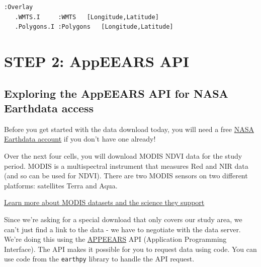 \documentclass[
  letterpaper,
  DIV=11,
  numbers=noendperiod,
  oneside]{scrreprt}
\begin{document}
\begin{verbatim}
:Overlay
   .WMTS.I     :WMTS   [Longitude,Latitude]
   .Polygons.I :Polygons   [Longitude,Latitude]
\end{verbatim}


\chapter{STEP 2: AppEEARS API}\label{step-2-appeears-api}

\section{Exploring the AppEEARS API for NASA Earthdata
access}\label{exploring-the-appeears-api-for-nasa-earthdata-access}

Before you get started with the data download today, you will need a
free \href{https://urs.earthdata.nasa.gov/home}{NASA Earthdata account}
if you don't have one already!

Over the next four cells, you will download MODIS NDVI data for the
study period. MODIS is a multispectral instrument that measures Red and
NIR data (and so can be used for NDVI). There are two MODIS sensors on
two different platforms: satellites Terra and Aqua.

\begin{tcolorbox}[enhanced jigsaw, colbacktitle=quarto-callout-color!10!white, opacityback=0, bottomtitle=1mm, toptitle=1mm, bottomrule=.15mm, left=2mm, colframe=quarto-callout-color-frame, leftrule=.75mm, opacitybacktitle=0.6, colback=white, rightrule=.15mm, toprule=.15mm, breakable, titlerule=0mm, title=\textcolor{quarto-callout-color}{\faInfo}\hspace{0.5em}{Read More}, coltitle=black, arc=.35mm]

\href{https://modis.gsfc.nasa.gov/}{Learn more about MODIS datasets and
the science they support}

\end{tcolorbox}

Since we're asking for a special download that only covers our study
area, we can't just find a link to the data - we have to negotiate with
the data server. We're doing this using the
\href{https://appeears.earthdatacloud.nasa.gov/api/}{APPEEARS} API
(Application Programming Interface). The API makes it possible for you
to request data using code. You can use code from the \texttt{earthpy}
library to handle the API request.
\end{document}
